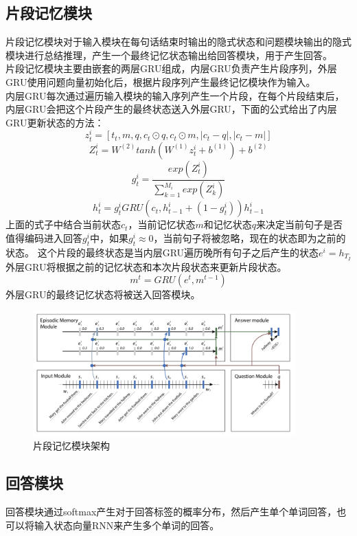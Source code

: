 \subsection{片段记忆模块}
片段记忆模块对于输入模块在每句话结束时输出的隐式状态和问题模块输出的隐式模块进行总结推理，产生一个最终记忆状态输出给回答模块，用于产生回答。\\
片段记忆模块主要由嵌套的两层GRU组成，内层GRU负责产生片段序列，外层GRU使用问题向量初始化后，根据片段序列产生最终记忆模块作为输入。\\
内层GRU每次通过遍历输入模块的输入序列产生一个片段，在每个片段结束后，内层GRU会把这个片段产生的最终状态送入外层GRU，下面的公式给出了内层GRU更新状态的方法：\cite{xiong2016dynamic}\\
\begin{equation}
z^i_t = [t_t,m,q,c_t \odot q, c_t \odot m,| c_t - q |,|c_t - m|]
\end{equation}
\begin{equation}
Z^i_t = W^{(2)}tanh(W^{(1)}z^i_t+b^{(1)})+b^{(2)}
\end{equation}
\begin{equation}
g^i_t = \frac{exp(Z^i_t)}{\sum_{k=1}^{M_i}exp(Z^i_k)}
\end{equation}
\begin{equation}
h^i_t = g^i_tGRU(c_t,h^i_{t-1} + (1 - g^i_t))h^i_{t-1}
\end{equation}
上面的式子中结合当前状态$c_t$，当前记忆状态$m$和记忆状态$q$来决定当前句子是否值得编码进入回答$g^i_t$中，如果$g^i_t \approx 0$，当前句子将被忽略，现在的状态即为之前的状态。
这个片段的最终状态是当内层GRU遍历晚所有句子之后产生的状态$e^i = h_{T_I}$\\
外层GRU将根据之前的记忆状态和本次片段状态来更新片段状态。\\
\begin{equation}
m^t = GRU(e^t,m^{t-1})
\end{equation}
外层GRU的最终记忆状态将被送入回答模块。
\begin{figure}[h]
      \centering
        \includegraphics[width=0.9\textwidth]{./images/episodic-memory-structure}
          \caption{片段记忆模块架构}
      \end{figure}
\subsection{回答模块}
回答模块通过softmax产生对于回答标签的概率分布，然后产生单个单词回答，也可以将输入状态向量RNN来产生多个单词的回答。